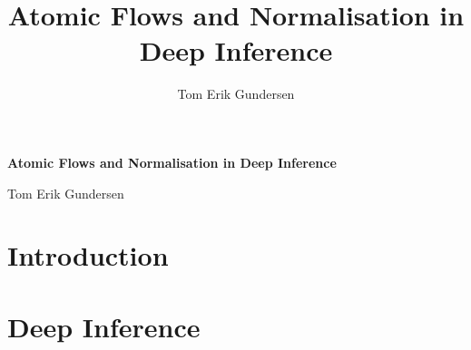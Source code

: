 \documentclass[11pt]{report}
\author{Tom Erik Gundersen}
\title{Atomic Flows and Normalisation in Deep Inference}
\begin{document}
%
%

\renewcommand{\thepage}{\roman{page}}
\maketitle

\clearpage
\thispagestyle{plain}
{\begin{center}
\vspace*{1.7cm}
{\def\baselinestretch{1.2}\Huge\bf Atomic Flows and Normalisation in Deep Inference \par}
\vspace{4cm}
{\begin{center}{\huge Tom Erik Gundersen }\end{center}}
\end{center}}


%



{
\tableofcontents 
}
\newpage
{}
\part{Introduction}

\part{Deep Inference}



\end{document}
